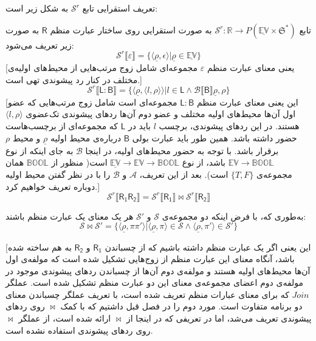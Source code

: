 تعریف استقرایی تابع 
$\mathcal{S}^r$
به شکل زیر است:
\begin{defn}
	تابع 
	$\mathcal{S}^r:\mathbb{R}\rightarrow \mathit{P}(\mathbb{\underline{EV}\times \mathfrak{S}}^*)$
	به صورت استقرایی روی ساختار عبارت منظم $\mathsf{R}$ به صورت زیر تعریف می‌شود:
$$\mathcal{S}^r\llbracket\varepsilon\rrbracket= \{ \langle \underline{\rho} , \epsilon \rangle | \underline{\rho} \in \underline{\mathbb{EV}}\}$$
[یعنی معنای عبارت منظم
$\varepsilon$
مجموعه‌ای شامل زوج مرتب‌هایی از محیط‌های اولیه‌ی مختلف در کنار رد پیشوندی تهی است.]
$$\mathcal{S}^r\llbracket\mathsf{L:B}\rrbracket = \{\langle\underline{\rho},\langle l , \rho \rangle \rangle | l \in \mathsf{L} \land \mathcal{B}\llbracket\mathsf{B}\rrbracket \underline{\rho},\rho \}$$
[این یعنی معنای عبارت منظم
$\mathsf{L:B}$
مجموعه‌ای است شامل زوج مرتب‌هایی که عضو اول آن‌ها محیط‌های اولیه مختلف و عضو دوم آن‌ها ردهای پیشوندی تک‌عضوی 
$\langle l , \rho \rangle$
هستند. در این ردهای پیشوندی، برچسب 
$l$
باید در
$\mathsf{L}$
که مجموعه‌ای از برچسب‌هاست حضور داشته باشد. همین طور باید عبارت بولی 
$\mathsf{B}$
درباره‌ی محیط اولیه
$\underline{\rho}$
و محیط 
$\rho$
برقرار باشد. با توجه به حضور محیط‌های اولیه، در اینجا
$\mathcal{B}$
به جای اینکه از نوع 
$\mathbb{EV} \rightarrow \mathbb{BOOL}$
باشد، از نوع
$\underline{\mathbb{EV}} \rightarrow \mathbb{EV} \rightarrow \mathbb{BOOL}$
است( منظور از 
$\mathbb{BOOL}$
همان مجموعه‌ی 
$\{\mathit{T,F}\}$
است). بعد از این تعریف،
$\mathcal{A}$
و 
$\mathcal{B}$
را با در نظر گفتن محیط اولیه دوباره تعریف خواهیم کرد.]
$$\mathcal{S}^r\llbracket\mathsf{R_1 R_2}\rrbracket= \mathcal{S}^r\llbracket\mathsf{R_1}\rrbracket \Join \mathcal{S}^r\llbracket\mathsf{R_2}\rrbracket$$
\begin{center}
	به‌طوری که، با فرض اینکه دو مجموعه‌ی 
	$\mathcal{S}$
	و
	$\mathcal{S'}$
	هر یک معنای یک عبارت منظم باشند:
$$\mathcal{S \Join S'}=
\{
\langle \underline{\rho}, \pi \pi' \rangle |
\langle \underline{\rho},\pi \rangle \in \mathcal{S} \land
\langle \underline{\rho},\pi' \rangle \in \mathcal{S'}
\}
$$
\end{center}
[این یعنی اگر یک عبارت منظم داشته باشیم که از چسباندن 
$\mathsf{R_1}$
و 
$\mathsf{R_2}$
به هم ساخته شده باشد، آنگاه معنای این عبارت منظم از زوج‌هایی تشکیل شده است که مولفه‌ی اول آن‌ها محیط‌های اولیه هستند و مولفه‌ی دوم آن‌ها از چسباندن ردهای پیشوندی موجود در مولفه‌ی دوم اعضای مجموعه‌ی معنای این دو عبارت منظم تشکیل شده است. عملگر $Join$ که برای معنای عبارات منظم تعریف شده است، با تعریف عملگر چسباندن معنای دو برنامه متفاوت است. مورد دوم را در فصل قبل داشتیم که با کمک $\Join$ روی ردهای پیشوندی تعریف می‌شد، اما در تعریفی که در اینجا از $\Join$ ارائه شده است، از عملگر $\Join$ روی ردهای پیشوندی استفاده نشده است.


\end{defn}
